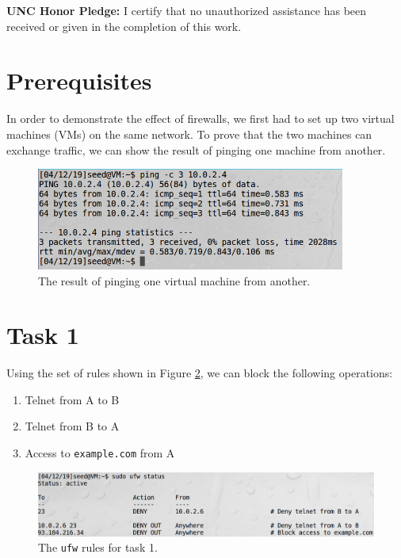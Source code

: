 \documentclass[12pt,letterpaper]{article}
\author{Chathan Driehuys}
\begin{document}
	\noindent \textbf{UNC Honor Pledge:} I certify that no unauthorized assistance has been received or given in the completion of this work.
	
	\vspace{.5in}
	
	\section*{Prerequisites}
		In order to demonstrate the effect of firewalls, we first had to set up two virtual machines (VMs) on the same network. To prove that the two machines can exchange traffic, we can show the result of pinging one machine from another.
		
		\begin{figure}[h]
			\begin{center}
				\includegraphics[width=4in]{task-0-ping}
			\end{center}
			\caption{The result of pinging one virtual machine from another.}
			\label{fig:task-0-ping}
		\end{figure}
	
	\section*{Task 1}
		Using the set of rules shown in Figure \ref{fig:task-1-ufw-rules}, we can block the following operations:
		
		\begin{enumerate}
			\item Telnet from A to B
			\item Telnet from B to A
			\item Access to \texttt{example.com} from A
		\end{enumerate}
		
		\begin{figure}
			\begin{center}
				\includegraphics[width=\linewidth]{task-1-ufw-rules}
			\end{center}
			\caption{The \texttt{ufw} rules for task 1.}
			\label{fig:task-1-ufw-rules}
		\end{figure}
		
\end{document}
